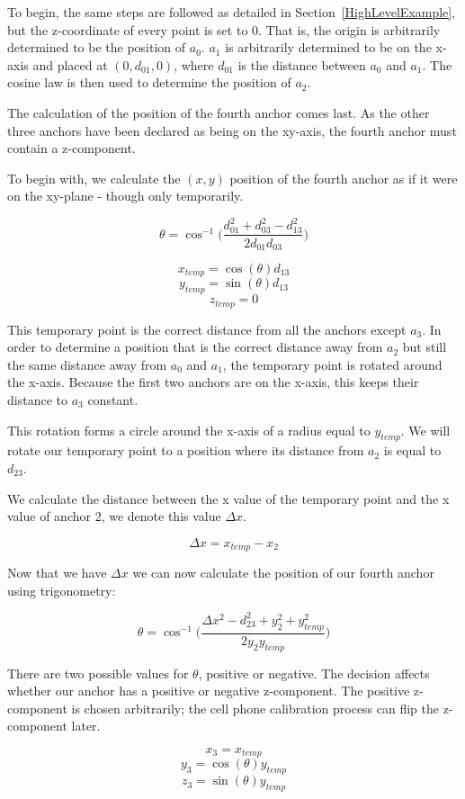 To begin, the same steps are followed as detailed in Section~\ref{HighLevelExample}, but the z-coordinate of every point is set to 0. That is, the origin is arbitrarily determined to be the position of $a_{0}$. $a_{1}$ is arbitrarily determined to be on the x-axis and placed at $(0, d_{01}, 0)$, where $d_{01}$ is the distance between $a_{0}$ and $a_{1}$. The cosine law is then used to determine the position of $a_{2}$.

The calculation of the position of the fourth anchor comes last. As the other three anchors have been declared as being on the xy-axis, the fourth anchor must contain a z-component.

To begin with, we calculate the $(x, y)$ position of the fourth anchor as if it were on the xy-plane - though only temporarily.

\[ \theta = \cos ^{ - 1}\Big(\frac{d_{01}^2 + d_{03}^2 - d_{13}^2 }{2 d_{01} d_{03}}\Big)\]

\[ x_{temp} = \cos(\theta) d_{13} \]
\[ y_{temp} = \sin(\theta) d_{13} \]
\[ z_{temp} = 0 \]

This temporary point is the correct distance from all the anchors except $a_3$. In order to determine a position that is the correct distance away from $a_2$ but still the same distance away from $a_0$ and $a_1$, the temporary point is rotated around the x-axis. Because the first two anchors are on the x-axis, this keeps their distance to $a_3$ constant.

This rotation forms a circle around the x-axis of a radius equal to $y_{temp}$. We will rotate our temporary point to a position where its distance from $a_2$ is equal to $d_{23}$.

We calculate the distance between the x value of the temporary point and the x value of anchor 2, we denote this value $\Delta x$.

\[ \Delta x = x_{temp} - x_{2} \]

Now that we have $\Delta x$ we can now calculate the position of our fourth anchor using trigonometry:

\[\theta = \cos ^{ - 1}\Big(\frac {\Delta x^2 - d_{23}^2 + y_{2}^2 + y_{temp}^2}{2 y_{2} y_{temp}}\Big)\]

There are two possible values for $\theta$, positive or negative. The decision affects whether our anchor has a positive or negative z-component. The positive z-component is chosen arbitrarily; the cell phone calibration process can flip the z-component later.

\[ x_{3} = x_{temp} \]
\[ y_{3} = \cos(\theta) y_{temp} \]
\[ z_{3} = \sin(\theta) y_{temp} \]

